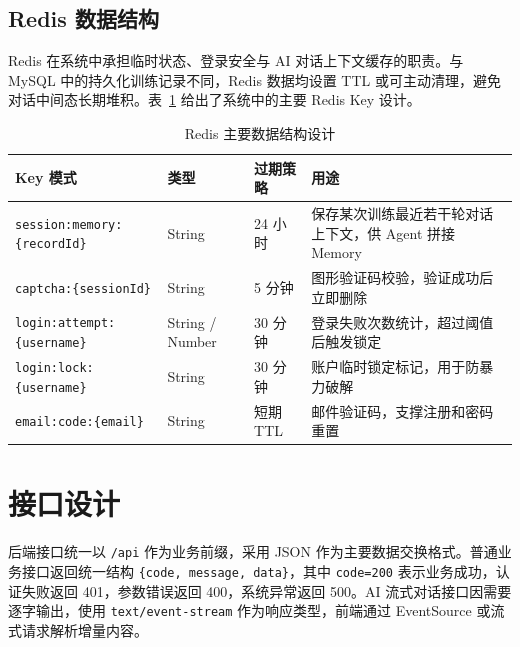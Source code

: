 \subsection{Redis 数据结构}
Redis 在系统中承担临时状态、登录安全与 AI 对话上下文缓存的职责。与 MySQL 中的持久化训练记录不同，Redis 数据均设置 TTL 或可主动清理，避免对话中间态长期堆积。表~\ref{tab:redis_keys} 给出了系统中的主要 Redis Key 设计。

\begin{table}[H]
    \centering
    \caption{Redis 主要数据结构设计}
    \label{tab:redis_keys}
    \small
    \begin{tabularx}{\textwidth}{@{}p{3.7cm}p{1.9cm}p{1.9cm}X@{}}
        \toprule
        Key 模式 & 类型 & 过期策略 & 用途 \\
        \midrule
        \texttt{session:memory:}\newline\texttt{\{recordId\}} & String & 24 小时 & 保存某次训练最近若干轮对话上下文，供 Agent 拼接 Memory \\
        \texttt{captcha:\{sessionId\}} & String & 5 分钟 & 图形验证码校验，验证成功后立即删除 \\
        \texttt{login:attempt:}\newline\texttt{\{username\}} & String / Number & 30 分钟 & 登录失败次数统计，超过阈值后触发锁定 \\
        \texttt{login:lock:}\newline\texttt{\{username\}} & String & 30 分钟 & 账户临时锁定标记，用于防暴力破解 \\
        \texttt{email:code:\{email\}} & String & 短期 TTL & 邮件验证码，支撑注册和密码重置 \\
        \bottomrule
    \end{tabularx}
\end{table}

\section{接口设计}
后端接口统一以 \texttt{/api} 作为业务前缀，采用 JSON 作为主要数据交换格式。普通业务接口返回统一结构 \texttt{\{code, message, data\}}，其中 \texttt{code=200} 表示业务成功，认证失败返回 401，参数错误返回 400，系统异常返回 500。AI 流式对话接口因需要逐字输出，使用 \texttt{text/event-stream} 作为响应类型，前端通过 EventSource 或流式请求解析增量内容。

